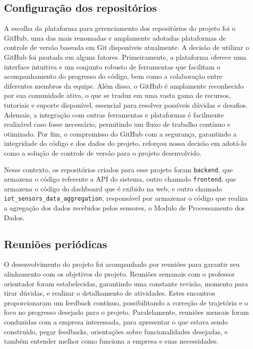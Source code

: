 \subsection{Configuração dos repositórios}
A escolha da plataforma para gerenciamento dos repositórios do projeto foi o GitHub, uma das mais renomadas e amplamente adotadas plataformas de controle de versão baseada em Git disponíveis atualmente. A decisão de utilizar o GitHub foi pautada em alguns fatores. Primeiramente, a plataforma oferece uma interface intuitiva e um conjunto robusto de ferramentas que facilitam o acompanhamento do progresso do código, bem como a colaboração entre diferentes membros da equipe. Além disso, o GitHub é amplamente reconhecido por sua comunidade ativa, o que se traduz em uma vasta gama de recursos, tutoriais e suporte disponível, essencial para resolver possíveis dúvidas e desafios. Ademais, a integração com outras ferramentas e plataformas é facilmente realizável caso fosse necessário, permitindo um fluxo de trabalho contínuo e otimizado. Por fim, o compromisso do GitHub com a segurança, garantindo a integridade do código e dos dados do projeto, reforçou nossa decisão em adotá-lo como a solução de controle de versão para o projeto desenvolvido. 

Nesse contexto, os repositórios criados para esse projeto foram \texttt{backend}, que armazena o código referente a \gls{API} do sistema, outro chamado \texttt{frontend}, que armazena o código do dashboard que é exibido na web, e outro chamado \texttt{iot\_sensors\_data\_aggregation}, responsável por armazenar o código que realiza a agregação dos dados recebidos pelos sensores, o Modulo de Processamento dos Dados.


\subsection{Reuniões periódicas}
O desenvolvimento do projeto foi acompanhado por reuniões para garantir seu alinhamento com os objetivos do projeto. Reuniões semanais com o professor orientador foram estabelecidas, garantindo uma constante revisão, momento para tirar dúvidas, e realizar o detalhamento de atividades. Estes encontros proporcionaram um feedback contínuo, possibilitando a correção de trajetória e o foco no progresso desejado para o projeto. Paralelamente, reuniões mensais foram conduzidas com a empresa interessada, para apresentar o que estava sendo construído, pegar feedbacks, orientações sobre funcionalidades desejadas, e também entender melhor como funciona a empresa e suas necessidades.

